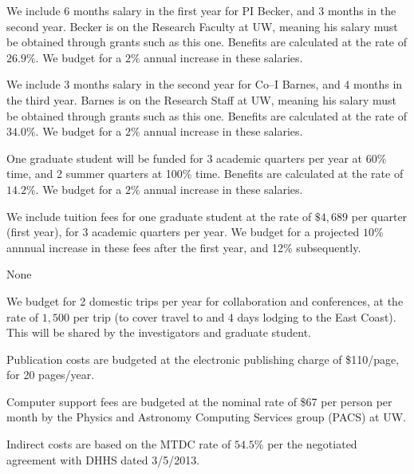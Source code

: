 \bigskip {} 

We include 6 months salary in the first year for PI Becker, and 3
months in the second year. Becker is on the Research Faculty at UW,
meaning his salary must be obtained through grants such as this one.
Benefits are calculated at the rate of $26.9\%$.  We budget for a
$2\%$ annual increase in these salaries.

We include 3 months salary in the second year for Co--I Barnes, and 4
months in the third year.  Barnes is on the Research Staff at UW,
meaning his salary must be obtained through grants such as this one.
Benefits are calculated at the rate of $34.0\%$.  We budget for a
$2\%$ annual increase in these salaries.

\bigskip {} 

One graduate student will be funded for 3 academic quarters per year
at 60\% time, and 2 summer quarters at 100\% time.  Benefits are
calculated at the rate of $14.2\%$.  We budget for a $2\%$ annual
increase in these salaries.

\bigskip {} 

We include tuition fees for one graduate student at the rate of
$\$4,689$ per quarter (first year), for 3 academic quarters per year.
We budget for a projected $10\%$ annnual increase in these fees after
the first year, and 12\% subsequently.

\bigskip {} 

None

\bigskip {} 

We budget for 2 domestic trips per year for collaboration and
conferences, at the rate of $1,500$ per trip (to cover travel to and 4
days lodging to the East Coast).  This will be shared by the
investigators and graduate student.

\bigskip {} 

Publication costs are budgeted at the electronic publishing charge
of \$110/page, for 20 pages/year.

\bigskip {} 

Computer support fees are budgeted at the nominal rate of \$67 per
person per month by the Physics and Astronomy Computing Services group
(PACS) at UW.  

\bigskip {} 

Indirect costs are based on the MTDC rate of $54.5\%$ per the
negotiated agreement with DHHS dated 3/5/2013.

